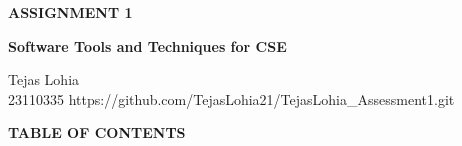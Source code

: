 \documentclass[12pt, a4paper]{report}
\begin{document}
\begin{titlepage}
    \centering
    \vspace*{\fill} %
    
    {\color{customOrange}\Huge\bfseries ASSIGNMENT 1}
    
    \vspace{0.75cm} %
    
    {\Large\bfseries Software Tools and Techniques for CSE}
    
    \vfill %
    
    \colorbox{customOrange}{%
        \parbox{1.0\textwidth}{%
            \centering
            \vspace{1em} %
            {\Large\color{white} Tejas Lohia} \\[0.5em] %
            {\large\color{white} 23110335} %
            {\large\color{white} https://github.com/TejasLohia21/TejasLohia_Assessment1.git} %
            \vspace{1em} %
        }
    }
    
    \vspace*{\fill} %
\end{titlepage}




\renewcommand{\cfttoctitlefont}{\hfill} 
\renewcommand{\cftaftertoctitle}{\hfill}
{\noindent\colorbox{customOrange}{\parbox{\textwidth}{\vspace{0.4em}\Large\bfseries\color{white}\hspace{1em}TABLE OF CONTENTS\vspace{0.4em}}}}

\tableofcontents 

\end{document}
